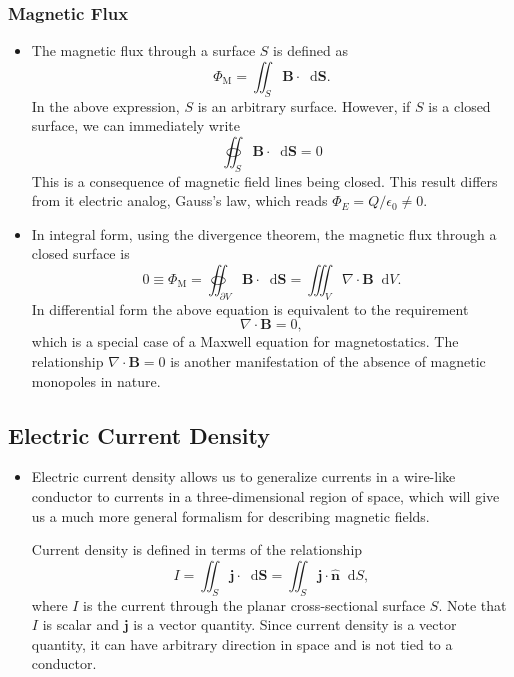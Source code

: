 \documentclass[11pt, a4paper]{article}
\newcommand{\diff}{\mathop{}\!\mathrm{d}} %
\renewcommand{\vec}[1]{\bm{#1}} %
\newcommand{\uvec}[1]{\hat{\vec{#1}}} %
\newcommand{\B}{\vec{B}} %
\newcommand{\ee}{\epsilon_{0}}  %
\renewcommand{\div}{\nabla \cdot}
\begin{document}
\subsubsection{Magnetic Flux}
\begin{itemize}
	\item The magnetic flux through a surface $ S $ is defined as
	\begin{equation*}
		\Phi_{\text{M}} = \iint_{S} \B \cdot \diff \vec{S}.
	\end{equation*}
	In the above expression, $ S $ is an arbitrary surface. However, if $ S $ is a closed surface, we can immediately write
	\begin{equation*}
	 	\oiint_{S} \B \cdot \diff \vec{S} = 0
	\end{equation*}
	This is a consequence of magnetic field lines being closed. This result differs from it electric analog, Gauss's law, which reads $ \Phi_{E} = Q/\ee \neq 0 $.
	
	\item In integral form, using the divergence theorem, the magnetic flux through a closed surface is
	\begin{equation*}
		0 \equiv \Phi_{\text{M}} = \oiint_{\partial V} \B \cdot \diff \vec{S} = \iiint_{V} \div \B \diff V.
	\end{equation*}
	In differential form the above equation is equivalent to the requirement
	\begin{equation*}
		\div \B = 0,
	\end{equation*}
    which is a special case of a Maxwell equation for magnetostatics. The relationship $ \div \B = 0 $ is another manifestation of the absence of magnetic monopoles in nature.
	
\end{itemize}

\subsection{Electric Current Density}
\begin{itemize}
	\item Electric current density allows us to generalize currents in a wire-like conductor to currents in a three-dimensional region of space, which will give us a much more general formalism for describing magnetic fields.
	
    Current density is defined in terms of the relationship
	\begin{equation*}
		I = \iint_{S} \vec{j} \cdot \diff \vec{S} = \iint_{S} \vec{j} \cdot \uvec{n} \diff S,
	\end{equation*}
    where $ I $ is the current through the planar cross-sectional surface $ S $. Note that $ I $ is scalar and $ \vec{j} $ is a vector quantity. Since current density is a vector quantity, it can have arbitrary direction in space and is not tied to a conductor. 
	
\end{itemize}
\end{document}
